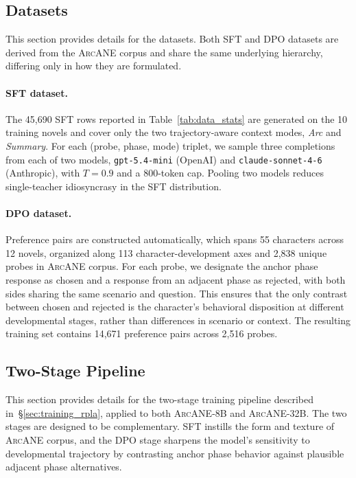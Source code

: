 \documentclass[11pt]{article}
\newcommand{\ours}{\textsc{ArcANE}}
\begin{document}
\subsection{Datasets}
\label{app:datasets_details}

This section provides details for the datasets. Both SFT and DPO datasets are derived from the \ours{} corpus and share the same underlying hierarchy, differing only in how they are formulated.

\paragraph{SFT dataset.}

The 45{,}690 SFT rows reported in Table~\ref{tab:data_stats} are generated on the 10 training novels and cover only the two trajectory-aware context modes, \emph{Arc} and \emph{Summary}. For each (probe, phase, mode) triplet, we sample three completions from each of two models, \texttt{gpt-5.4-mini} (OpenAI) and \texttt{claude-sonnet-4-6} (Anthropic), with $T=0.9$ and a 800-token cap. Pooling two models reduces single-teacher idiosyncrasy in the SFT distribution.

\paragraph{DPO dataset.}

Preference pairs are constructed automatically, which spans 55 characters across 12 novels, organized along 113 character-development axes and 2{,}838 unique probes in \ours{} corpus. For each probe, we designate the anchor phase response as chosen and a response from an adjacent phase as rejected, with both sides sharing the same scenario and question. This ensures that the only contrast between chosen and rejected is the character's behavioral disposition at different developmental stages, rather than differences in scenario or context. The resulting training set contains 14{,}671 preference pairs across 2{,}516 probes.


\subsection{Two-Stage Pipeline}
\label{app:training_pipeline}
This section provides details for the two-stage training pipeline described in~\S\ref{sec:training_rpla}, applied to both \ours{}-8B and \ours{}-32B. The two stages are designed to be complementary. SFT instills the form and texture of \ours{} corpus, and the DPO stage sharpens the model's sensitivity to developmental trajectory by contrasting anchor phase behavior against plausible adjacent phase alternatives.
\end{document}
